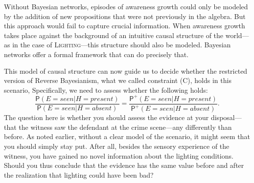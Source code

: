\documentclass[
  11pt,
  dvipsnames,enabledeprecatedfontcommands]{scrartcl}
\newcommand{\pr}[1]{\ensuremath{\mathsf{P}(#1)}}
\newcommand{\ppr}[2]{\ensuremath{\mathsf{P}^{#1}(#2)}}
\begin{document}
Without Bayesian networks, episodes of awareness growth could only be
modeled by the addition of new propositions that were not previously in
the algebra. But this approach would fail to capture crucial
information. When awareness growth takes place against the background of
an intuitive causal structure of the world---as in the case of
\textsc{Lighting}---this structure should also be modeled. Bayesian
networks offer a formal framework that can do precisely that.

This model of causal structure can now guide us to decide whether the
restricted version of Reverse Bayesianism, what we called constraint
(C), holds in this scenario, Specifically, we need to assess whether the
following holds:
\[\frac{\pr{E=seen \vert H=present}}{\pr{E=seen \vert H=absent}}= \frac{\ppr{+}{E=seen \vert H=present}}{\ppr{+}{E=seen \vert H=absent}}.\]
The question here is whether you should assess the evidence at your
disposal---that the witness saw the defendant at the crime scene---any
differently than before. As noted earlier, without a clear model of the
scenario, it might seem that you should simply stay put. After all,
besides the sensory experience of the witness, you have gained no novel
information about the lighting conditions. Should you thus conclude that
the evidence has the same value before and after the realization that
lighting could have been bad?
\end{document}
